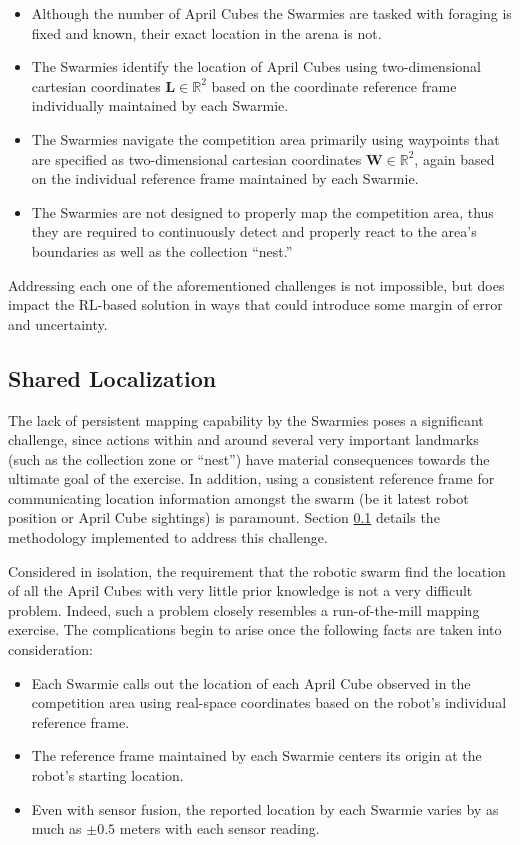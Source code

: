 \documentclass[sigconf,authordraft]{acmart}
\begin{document}
\begin{itemize}
  \item Although the number of April Cubes the Swarmies are tasked with foraging is fixed and known, their exact location in the arena is not.
  \item The Swarmies identify the location of April Cubes using two-dimensional cartesian coordinates $\textbf{L} \in \mathbb{R}^2$ based on the coordinate reference frame individually maintained by each Swarmie.
  \item The Swarmies navigate the competition area primarily using waypoints that are specified as two-dimensional cartesian coordinates $\textbf{W} \in \mathbb{R}^2$, again based on the individual reference frame maintained by each Swarmie.
  \item The Swarmies are not designed to properly map the competition area, thus they are required to continuously detect and properly react to the area's boundaries as well as the collection ``nest.''
\end{itemize}

Addressing each one of the aforementioned challenges is not impossible, but does impact the RL-based solution in ways that could introduce some margin of error and uncertainty.

\subsection{Shared Localization}\label{subsec:localization}
The lack of persistent mapping capability by the Swarmies poses a significant challenge, since actions within and around several very important landmarks (such as the collection zone or ``nest'') have material consequences towards the ultimate goal of the exercise. In addition, using a consistent reference frame for communicating location information amongst the swarm (be it latest robot position or April Cube sightings) is paramount. Section \ref{subsec:localization} details the methodology implemented to address this challenge.

Considered in isolation, the requirement that the robotic swarm find the location of all the April Cubes with very little prior knowledge is not a very difficult problem. Indeed, such a problem closely resembles a run-of-the-mill mapping exercise. The complications begin to arise once the following facts are taken into consideration:

\begin{itemize}
  \item Each Swarmie calls out the location of each April Cube observed in the competition area using real-space coordinates based on the robot's individual reference frame.
  \item The reference frame maintained by each Swarmie centers its origin at the robot's starting location.
  \item Even with sensor fusion, the reported location by each Swarmie varies by as much as $\pm 0.5$ meters with each sensor reading.
\end{itemize}
\end{document}
